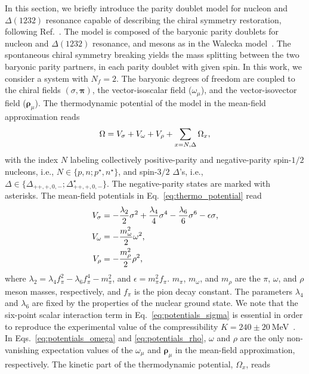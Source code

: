 \documentclass[preprint,showkeys,lengthcheck,nofootinbib,twocolumn,notitlepage,floatfix,superscriptaddress]{revtex4-1}
\begin{document}
In this section, we briefly introduce the parity doublet model for nucleon and $\Delta(1232)$ resonance capable of describing the chiral symmetry restoration, following Ref.~\cite{Takeda:2017mrm}. The model is composed of the baryonic parity doublets for nucleon and $\Delta(1232)$ resonance, and mesons as in the Walecka model~\cite{Walecka:1974qa}. The spontaneous chiral symmetry breaking yields the mass splitting between the two baryonic parity partners, in each parity doublet with given spin. In this work, we consider a system with $N_f=2$. The baryonic degrees of freedom are coupled to the chiral fields $\left(\sigma, \boldsymbol\pi\right)$, the vector-isoscalar field ($\omega_\mu$), and the vector-isovector field ($\boldsymbol \rho_\mu$). The thermodynamic potential of the model in the mean-field approximation reads~\cite{Takeda:2017mrm}
\begin{equation}\label{eq:thermo_potential}
	\Omega = V_\sigma + V_\omega + V_\rho + \sum_{x=N,\Delta}\Omega_x\rm,
\end{equation}
with the index $N$ labeling collectively positive-parity and negative-parity spin-$1/2$ nucleons, i.e., $N\in \lbrace p,n;p^\star,n^\star \rbrace$, and spin-$3/2$ $\Delta$'s, i.e., \mbox{$\Delta \in \lbrace\Delta_{++,+,0,-};\Delta^\star_{++,+,0,-}\rbrace$}. The negative-parity states are marked with asterisks. The mean-field potentials in Eq.~\eqref{eq:thermo_potential} read
\begin{subequations}\label{eq:potentials}
\begin{align}
  V_\sigma &= -\frac{\lambda_2}{2}\sigma^2 + \frac{\lambda_4}{4}\sigma^4 - \frac{\lambda_6}{6}\sigma^6 - \epsilon\sigma \textrm,\label{eq:potentials_sigma}\\
  V_\omega &= -\frac{m_\omega^2 }{2}\omega^2\textrm,\label{eq:potentials_omega}\\
  V_\rho &= - \frac{m_\rho^2}{2}\rho^2\textrm,\label{eq:potentials_rho}
\end{align}
\end{subequations}
where $\lambda_2 = \lambda_4f_\pi^2 - \lambda_6f_\pi^4 - m_\pi^2$, and $\epsilon = m_\pi^2 f_\pi$. $m_\pi$, $m_\omega$, and $m_\rho$ are the $\pi$, $\omega$, and $\rho$ meson masses, respectively, and $f_\pi$ is  the pion decay constant. The parameters $\lambda_4$ and $\lambda_6$ are fixed by the properties of the nuclear ground state. We note that the six-point scalar interaction term in Eq.~\eqref{eq:potentials_sigma} is essential in order to reproduce the experimental value of the compressibility \mbox{$K=240\pm20~$MeV~\cite{Shlomo, Motohiro:2015taa}}.  In Eqs.~\eqref{eq:potentials_omega} and \eqref{eq:potentials_rho}, $\omega$ and $\rho$ are the only non-vanishing expectation values of the $\omega_\mu$ and $\boldsymbol \rho_\mu$ in the mean-field approximation, respectively. The kinetic part of the thermodynamic potential, $\Omega_x$, reads
\end{document}
